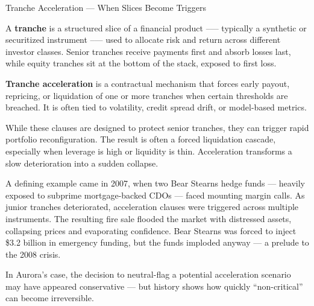 \begin{TechnicalSidebar}{Tranche Acceleration — When Slices Become Triggers}

  A \textbf{tranche} is a structured slice of a financial product --— typically a synthetic or securitized 
  instrument --— used to allocate risk and return across different investor classes. Senior tranches receive 
  payments first and absorb losses last, while equity tranches sit at the bottom of the stack, exposed to 
  first loss.

  \medskip

  \textbf{Tranche acceleration} is a contractual mechanism that forces early payout, repricing, or 
  liquidation of one or more tranches when certain thresholds are breached. It is often tied to volatility, 
  credit spread drift, or model-based metrics.

  \medskip
  
  While these clauses are designed to protect senior tranches, they can trigger rapid portfolio reconfiguration. 
  The result is often a forced liquidation cascade, especially when leverage is high or liquidity is thin. 
  Acceleration transforms a slow deterioration into a sudden collapse.

  \medskip
  
  A defining example came in 2007, when two Bear Stearns hedge funds — heavily exposed to subprime mortgage-backed 
  CDOs — faced mounting margin calls. As junior tranches deteriorated, acceleration clauses were triggered across 
  multiple instruments. The resulting fire sale flooded the market with distressed assets, collapsing prices and 
  evaporating confidence. Bear Stearns was forced to inject \$3.2 billion in emergency funding, but the funds 
  imploded anyway — a prelude to the 2008 crisis.

  \medskip
  
  In Aurora’s case, the decision to neutral-flag a potential acceleration scenario may have appeared conservative 
  — but history shows how quickly “non-critical” can become irreversible.
  
\end{TechnicalSidebar}

\medskip

